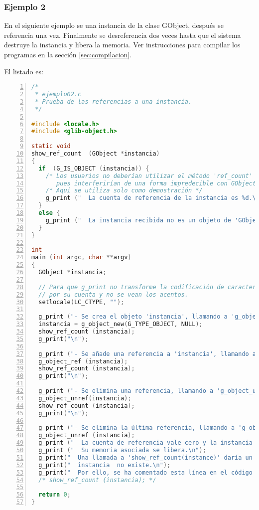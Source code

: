 \subsubsection{Ejemplo 2}
En el siguiente ejemplo se una instancia de la clase \textsf{GObject}, después se referencia una vez.
Finalmente se desreferencia dos veces hasta que el sistema destruye la instancia y libera la memoria.
Ver instrucciones para compilar los programas en la sección \ref{sec:compilacion}.

El listado es:
\begin{lstlisting}[language=C, numbers=left]
/*
 * ejemplo02.c
 * Prueba de las referencias a una instancia.
 */

#include <locale.h>
#include <glib-object.h>

static void
show_ref_count  (GObject *instancia)
{
  if  (G_IS_OBJECT (instancia)) {
    /* Los usuarios no deberían utilizar el método 'ref_count' en sus programas.
       pues interferirían de una forma impredecible con GObject */
    /* Aquí se utiliza solo como demostración */
    g_print ("  La cuenta de referencia de la instancia es %d.\n", instancia->ref_count);
  }
  else {
    g_print ("  La instancia recibida no es un objeto de 'GObjectClass'.\n");
  }
}

int
main (int argc, char **argv)
{
  GObject *instancia;

  // Para que g_print no transforme la codificación de caracteres
  // por su cuenta y no se vean los acentos.
  setlocale(LC_CTYPE, "");

  g_print ("- Se crea el objeto 'instancia', llamando a 'g_object_new'.\n");
  instancia = g_object_new(G_TYPE_OBJECT, NULL);
  show_ref_count (instancia);
  g_print("\n");
  
  g_print ("- Se añade una referencia a 'instancia', llamando a 'g_object_ref'.\n");
  g_object_ref (instancia);
  show_ref_count (instancia);
  g_print("\n");

  g_print ("- Se elimina una referencia, llamando a 'g_object_unref'.\n");
  g_object_unref(instancia);
  show_ref_count (instancia);
  g_print("\n");

  g_print ("- Se elimina la última referencia, llamando a 'g_object_unref'.\n");
  g_object_unref (instancia);
  g_print ("  La cuenta de referencia vale cero y la instancia se destruye.\n");
  g_print ("  Su memoria asociada se libera.\n");
  g_print("  Una llamada a 'show_ref_count(instance)' daría un error, pues la\n");
  g_print("  instancia  no existe.\n");
  g_print("  Por ello, se ha comentado esta línea en el código fuente.\n");
  /* show_ref_count (instancia); */
  
  return 0;
}
\end{lstlisting}

